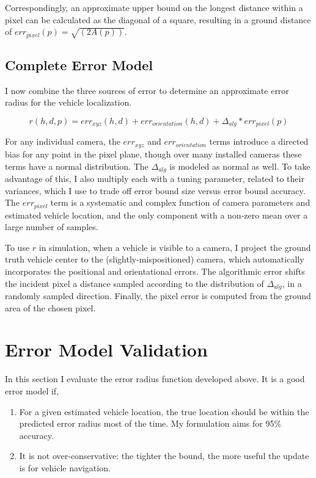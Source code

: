\documentclass[a4paper,12pt,twoside,openright]{report}
\begin{document}
Correspondingly, an approximate upper bound on the longest distance
within a pixel can be calculated as the diagonal of a square,
resulting in a ground distance of $err_{pixel}(p) = \sqrt{(2A(p))}$. 


\subsection{Complete Error Model}

I now combine the three sources of error to determine an approximate
error radius for the vehicle localization.

\[
    r(h,d,p) = err_{xyz}(h,d) + err_{orientation}(h,d) + \Delta_{alg}*err_{pixel}(p)
\]

For any individual camera, the $err_{xyz}$ and $err_{orientation}$ terms introduce
a directed bias for any point in the pixel plane, though over many installed cameras
these terms have a normal distribution. The $\Delta_{alg}$ is 
modeled as normal as well. To take advantage of this, I also multiply each with a tuning
parameter, related to their variances, which I use to trade off error bound size versus
error bound accuracy. The $err_{pixel}$ term is a systematic 
and complex function of camera parameters and estimated vehicle location, and
the only component with a non-zero mean over a large number of samples.

To use $r$ in simulation, when a vehicle is visible to a camera,
I project the ground truth vehicle center to the (slightly-mispositioned) camera, which
automatically incorporates the positional and orientational errors.
The algorithmic error shifts the incident pixel a distance sampled according to the distribution 
of $\Delta_{alg}$, in a randomly sampled direction. 
Finally, the pixel error is computed from the ground area of the chosen pixel.

\section{Error Model Validation}
\label{sec:camera:validation}

In this section I evaluate the error radius function developed above. It is a good error model if,

\begin{enumerate}
    \item For a given estimated vehicle location, the true location should be within the predicted
          error radius most of the time. My formulation aims for 95\% accuracy.
    \item It is not over-conservative: the tighter the bound, the more useful the update is
          for vehicle navigation.
\end{enumerate}
\end{document}
